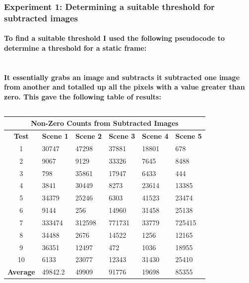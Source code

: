 \documentclass[11pt]{article} %
\begin{document}
\subsubsection{Experiment 1: Determining a suitable threshold for subtracted images}
\paragraph{To find a suitable threshold I used the following pseudocode to determine a threshold for a static frame:\\\\}
\begin{frame}[fragile]
	\vspace{-40pt}
	
\end{frame}
\paragraph{It essentially grabs an image and subtracts it subtracted one image from another and totalled up all the pixels with a value greater than zero. This gave the following table of results:}
\begin{center}
\begin{table}[!htbp]
	\begin{center}
	\begin{tabular}{| c | l | l | l | l | l | }
\hline
\multicolumn{6}{|c|}{\bf Non-Zero Counts from Subtracted Images} \\
\hline
\bf Test	&\bf Scene 1	&\bf Scene 2	&\bf Scene 3	&\bf Scene 4	&\bf Scene 5	\\ \hline
1	&30747	&47298	&37881	&18801	&678\\
2	&9067	&9129	&33326	&7645	&8488\\
3	&798	&35861	&17947	&6433	&444\\
4	&3841	&30449	&8273	&23614	&13385\\
5	&34379	&25246	&6303	&41523	&23474\\
6	&9144	&256	&14960	&31458	&25138\\
7	&333474	&312598	&771731	&33779	&725415\\
8	&34488	&2676	&14522	&1256	&12165\\
9	&36351	&12497	&472	&1036	&18955\\
10	&6133	&23077	&12343	&31430	&25410\\ \hline
\bf Average	&49842.2	&49909	&91776	&19698	&85355\\ \hline
	\end{tabular}
	\end{center}
	\caption{}
	\label{tab:sub1}
\end{table}
\end{center}
\end{document}
